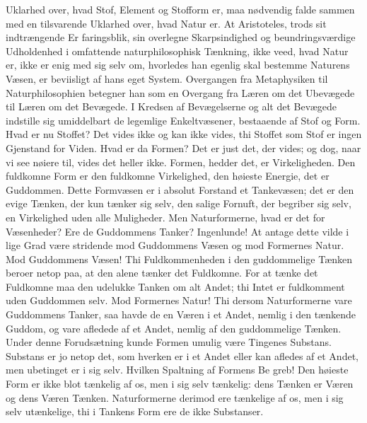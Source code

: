 \documentclass[12pt,a4paper]{book}
\begin{document}
Uklarhed over, hvad Stof, Element og Stofform er, maa nødvendig falde sammen
med en tilsvarende Uklarhed over, hvad Natur er. At Aristoteles, trods sit
indtrængende Er\-%
faringsblik, sin overlegne Skarpsindighed og beundringsværdige Udholdenhed i
omfattende naturphilosophisk Tænkning, ikke veed, hvad Natur er, ikke er enig
med sig selv om, hvorledes han egenlig skal bestemme Naturens Væsen, er
beviisligt af hans eget System. Overgangen fra Metaphysiken til
Naturphilosophien betegner han som en Overgang fra Læren om det Ubevægede til
Læren om det Bevægede. I Kredsen af Bevægelserne og alt det Bevægede indstille
sig umiddelbart de legemlige Enkeltvæsener, bestaaende af Stof og Form. Hvad
er nu Stoffet? Det vides ikke og kan ikke vides, thi Stoffet som Stof er ingen
Gjenstand for Viden. Hvad er da Formen? Det er just det, der vides; og dog,
naar vi see nøiere til, vides det heller ikke. Formen, hedder det, er
Virkeligheden. Den fuldkomne Form er den fuldkomne Virkelighed, den høieste
Energie, det er Guddommen. Dette Formvæsen er i absolut Forstand et
Tankevæsen; det er den evige Tænken, der kun tænker sig selv, den salige
Fornuft, der begriber sig selv, en Virkelighed uden alle Muligheder. Men
Naturformerne, hvad er det for Væsenheder? Ere de Guddommens Tanker?
Ingenlunde! At antage dette vilde i lige Grad være stridende mod Guddommens
Væsen og mod Formernes Natur. Mod Guddommens Væsen! Thi Fuldkommenheden i den
guddommelige Tænken beroer netop paa, at den alene tænker det Fuldkomne. For
at tænke det Fuldkomne maa den udelukke Tanken om alt Andet; thi Intet er
fuldkomment uden Guddommen selv. Mod Formernes Natur! Thi dersom Naturformerne
vare Guddommens Tanker, saa havde de en Væren i et Andet, nemlig i den
tænkende Guddom, og vare afledede af et Andet, nemlig af den guddommelige
Tænken. Under denne Forudsætning kunde Formen umulig være Tingenes Substans.
Substans er jo netop det, som hverken er i et Andet eller kan afledes af et
Andet, men ubetinget er i sig selv. Hvilken Spaltning af Formens Be\-%
greb! Den høieste Form er ikke blot tænkelig af os, men i sig selv tænkelig:
dens Tænken er Væren og dens Væren Tænken. Naturformerne derimod ere
tænkelige af os, men i sig selv utænkelige, thi i Tankens Form ere de ikke
Substanser.
\end{document}
